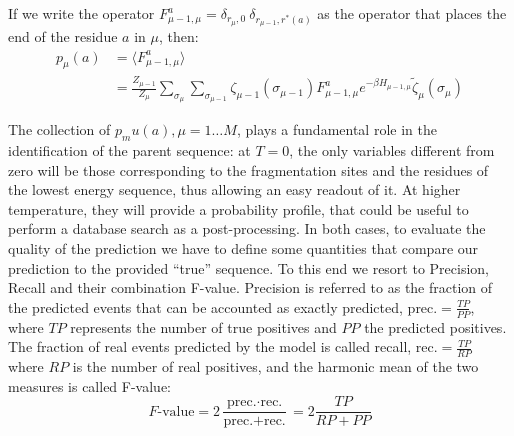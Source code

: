 If we write the operator $F_{\mu-1,\mu}^{a}=\delta_{r_\mu,0}\
\delta_{r_{\mu-1},r^*(a)}
$ as the operator that places
the end of the residue $a$ in $\mu$, then:
\begin{align}
p_\mu(a) 
&=
\langle F_{\mu-1,\mu}^{a}\rangle\\
&=
\frac{Z_{\mu-1}}{Z_\mu}
\sum_{\sigma_{\mu}} \sum_{\sigma_{\mu-1}}
\zeta_{\mu-1}(\sigma_{\mu-1})
F_{\mu-1,\mu}^{a}
e^{-\beta H_{\mu-1,\mu}} \tilde\zeta_\mu(\sigma_\mu)
\label{eq:p_mu_end}
\end{align}

The collection of $p_mu(a),\mu=1\dots M$, plays a fundamental role in the
identification of the parent sequence: at $T=0$, the only variables different
from zero will be those corresponding to the fragmentation sites and the
residues of the lowest energy sequence, thus allowing an easy readout of it.
At higher temperature, they will provide a probability profile, that could be
useful to perform a database search as a post-processing.
In both cases, to evaluate the quality of the prediction we have to define some
quantities that compare our prediction to the provided ``true'' sequence.
To this end we resort to Precision, Recall and their combination F-value. 
Precision is referred to as the fraction
of the predicted events that can be accounted as exactly predicted,
$\text{prec.}= \frac{TP}{PP}$, where $TP$ represents the number of true positives
and $PP$ the predicted positives.
The fraction of real events predicted by the model is called recall,
$\text{rec.}=\frac{TP}{RP}$ where $RP$ is the number of real positives, and the
harmonic mean of the two measures is called F-value:
\begin{equation}
F\text{-value}=2\frac{\text{prec.$\cdot$rec.}}{\text{prec.$+$rec.}}=
2\frac{TP}{RP+PP}
\end{equation}

